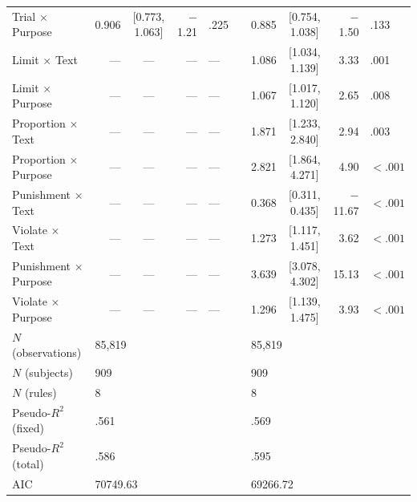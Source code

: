 \documentclass[pdflatex,sn-nature]{sn-jnl}
\begin{document}
\begin{appendices}
\begin{table}
\begin{tabular*}{\textheight}{@{\extracolsep{\fill}}lrcrllrcrl@{}}
Trial $\times$ Purpose   & 0.906 & [0.773, 1.063] & $-$1.21  & .225   && 0.885 & [0.754, 1.038] & $-$1.50 & .133   \\
Limit $\times$ Text      & ---   & ---            & ---     & ---    && 1.086 & [1.034, 1.139] & 3.33   & .001   \\
Limit $\times$ Purpose   & ---   & ---            & ---     & ---    && 1.067 & [1.017, 1.120] & 2.65   & .008   \\
Proportion $\times$ Text & ---   & ---            & ---     & ---    && 1.871 & [1.233, 2.840] & 2.94   & .003   \\
Proportion $\times$ Purpose & --- & ---           & ---     & ---    && 2.821 & [1.864, 4.271] & 4.90   & $<.001$ \\
Punishment $\times$ Text & ---   & ---            & ---     & ---    && 0.368 & [0.311, 0.435] & $-$11.67 & $<.001$ \\
Violate $\times$ Text    & ---   & ---            & ---     & ---    && 1.273 & [1.117, 1.451] & 3.62   & $<.001$ \\
Punishment $\times$ Purpose & --- & ---           & ---     & ---    && 3.639 & [3.078, 4.302] & 15.13  & $<.001$ \\
Violate $\times$ Purpose & ---   & ---            & ---     & ---    && 1.296 & [1.139, 1.475] & 3.93   & $<.001$ \\
\midrule
$N$ (observations)       & \multicolumn{4}{l}{85,819} && \multicolumn{4}{l}{85,819} \\
$N$ (subjects)           & \multicolumn{4}{l}{909}    && \multicolumn{4}{l}{909}    \\
$N$ (rules)              & \multicolumn{4}{l}{8}      && \multicolumn{4}{l}{8}      \\
Pseudo-$R^2$ (fixed)     & \multicolumn{4}{l}{.561}   && \multicolumn{4}{l}{.569}   \\
Pseudo-$R^2$ (total)     & \multicolumn{4}{l}{.586}   && \multicolumn{4}{l}{.595}   \\
AIC                      & \multicolumn{4}{l}{70749.63} && \multicolumn{4}{l}{69266.72} \\
\bottomrule
\end{tabular*}
\end{table}

\clearpage


\end{appendices}
\end{document}
